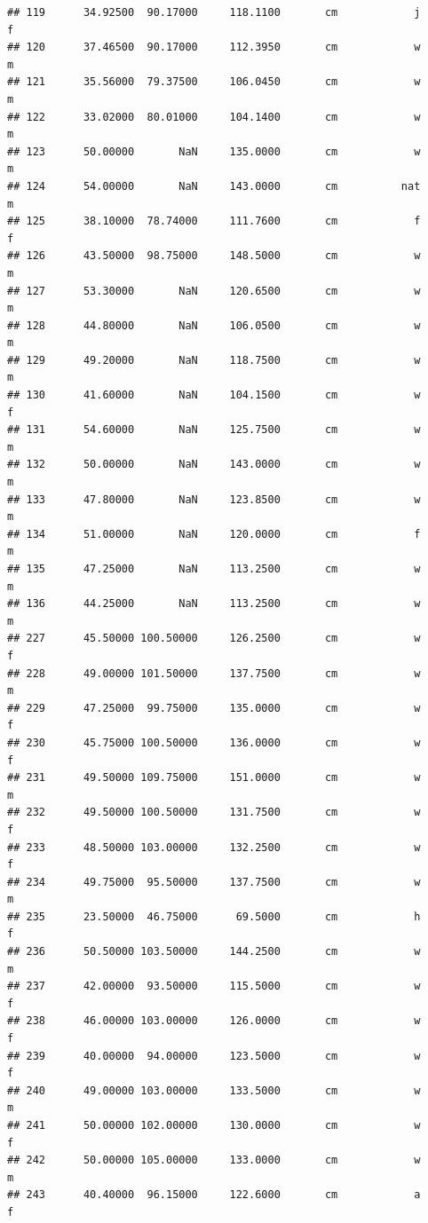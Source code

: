 \documentclass[]{article}
\begin{document}
\begin{verbatim}
## 119      34.92500  90.17000     118.1100       cm            j         f
## 120      37.46500  90.17000     112.3950       cm            w         m
## 121      35.56000  79.37500     106.0450       cm            w         m
## 122      33.02000  80.01000     104.1400       cm            w         m
## 123      50.00000       NaN     135.0000       cm            w         m
## 124      54.00000       NaN     143.0000       cm          nat         m
## 125      38.10000  78.74000     111.7600       cm            f         f
## 126      43.50000  98.75000     148.5000       cm            w         m
## 127      53.30000       NaN     120.6500       cm            w         m
## 128      44.80000       NaN     106.0500       cm            w         m
## 129      49.20000       NaN     118.7500       cm            w         m
## 130      41.60000       NaN     104.1500       cm            w         f
## 131      54.60000       NaN     125.7500       cm            w         m
## 132      50.00000       NaN     143.0000       cm            w         m
## 133      47.80000       NaN     123.8500       cm            w         m
## 134      51.00000       NaN     120.0000       cm            f         m
## 135      47.25000       NaN     113.2500       cm            w         m
## 136      44.25000       NaN     113.2500       cm            w         m
## 227      45.50000 100.50000     126.2500       cm            w         f
## 228      49.00000 101.50000     137.7500       cm            w         m
## 229      47.25000  99.75000     135.0000       cm            w         f
## 230      45.75000 100.50000     136.0000       cm            w         f
## 231      49.50000 109.75000     151.0000       cm            w         m
## 232      49.50000 100.50000     131.7500       cm            w         f
## 233      48.50000 103.00000     132.2500       cm            w         f
## 234      49.75000  95.50000     137.7500       cm            w         m
## 235      23.50000  46.75000      69.5000       cm            h         f
## 236      50.50000 103.50000     144.2500       cm            w         m
## 237      42.00000  93.50000     115.5000       cm            w         f
## 238      46.00000 103.00000     126.0000       cm            w         f
## 239      40.00000  94.00000     123.5000       cm            w         f
## 240      49.00000 103.00000     133.5000       cm            w         m
## 241      50.00000 102.00000     130.0000       cm            w         f
## 242      50.00000 105.00000     133.0000       cm            w         m
## 243      40.40000  96.15000     122.6000       cm            a         f

\end{verbatim}
\end{document}
